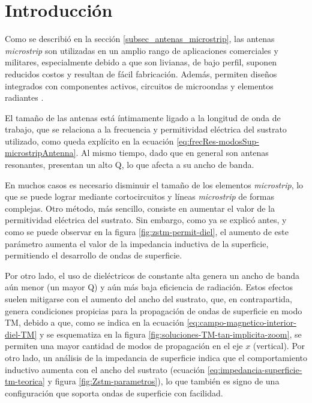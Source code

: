 
\section{Introducción}

Como se describió en la sección \ref{subsec_antenas_microstrip}, las antenas \textit{microstrip} son utilizadas en un amplio rango de aplicaciones comerciales y militares, especialmente debido a que son livianas, de bajo perfil, suponen reducidos costos y resultan de fácil fabricación. Además, permiten diseños integrados con componentes activos, circuitos de microondas y elementos radiantes \cite{Yang:EBGAntennas}.

El tamaño de las antenas está íntimamente ligado a la longitud de onda de trabajo, que se relaciona a la frecuencia y permitividad eléctrica del sustrato utilizado, como queda explícito en la ecuación \ref{eq:frecRes-modosSup-microstripAntenna}. Al mismo tiempo, dado que en general son antenas resonantes, presentan un alto Q, lo que afecta a su ancho de banda.

En muchos casos es necesario disminuir el tamaño de los elementos \textit{microstrip}, lo que se puede lograr mediante cortocircuitos y líneas \textit{microstrip} de formas complejas. Otro método, más sencillo, consiste en aumentar el valor de la permitividad eléctrica del sustrato. Sin embargo, como ya se explicó antes, y como se puede observar en la figura \ref{fig:zstm-permit-diel}, el aumento de este parámetro aumenta el valor de la impedancia inductiva de la superficie, permitiendo el desarrollo de ondas de superficie.

Por otro lado, el uso de dieléctricos de constante alta genera un ancho de banda aún menor (un mayor Q) y aún más baja eficiencia de radiación. Estos efectos suelen mitigarse con el aumento del ancho del sustrato, que, en contrapartida, genera condiciones propicias para la propagación de ondas de superficie en modo TM, debido a que, como se indica en la ecuación \ref{eq:campo-magnetico-interior-diel-TM} y se esquematiza en la figura \ref{fig:soluciones-TM-tan-implicita-zoom}, se permiten una mayor cantidad de modos de propagación en el eje $x$ (vertical). Por otro lado, un análisis de la impedancia de superficie indica que el comportamiento inductivo aumenta con el ancho del sustrato (ecuación \ref{eq:impedancia-superficie-tm-teorica} y figura \ref{fig:Zstm-parametros}), lo que también es signo de una configuración que soporta ondas de superficie con facilidad.

